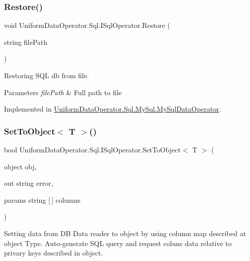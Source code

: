 \subsubsection{\texorpdfstring{Restore()}{Restore()}}
{\footnotesize\ttfamily void Uniform\+Data\+Operator.\+Sql.\+I\+Sql\+Operator.\+Restore (\begin{DoxyParamCaption}\item[{string}]{file\+Path }\end{DoxyParamCaption})}



Restoring S\+QL db from file. 


\begin{DoxyParams}{Parameters}
{\em file\+Path} & Full path to file\\
\hline
\end{DoxyParams}


Implemented in \mbox{\hyperlink{class_uniform_data_operator_1_1_sql_1_1_my_sql_1_1_my_sql_data_operator_a22a9e92989ebdb3a52b8ebe409c59831}{Uniform\+Data\+Operator.\+Sql.\+My\+Sql.\+My\+Sql\+Data\+Operator}}.

\mbox{\label{interface_uniform_data_operator_1_1_sql_1_1_i_sql_operator_af96d3f0bd2b58dfad705d2bfc3eba8fc}} 
\subsubsection{\texorpdfstring{Set\+To\+Object$<$ T $>$()}{SetToObject< T >()}}
{\footnotesize\ttfamily bool Uniform\+Data\+Operator.\+Sql.\+I\+Sql\+Operator.\+Set\+To\+Object$<$ T $>$ (\begin{DoxyParamCaption}\item[{object}]{obj,  }\item[{out string}]{error,  }\item[{params string \mbox{[}$\,$\mbox{]}}]{columns }\end{DoxyParamCaption})}



Setting data from DB Data reader to object by using column map described at object Type. Auto-\/generate S\+QL query and request coluns data relative to privary keys described in object. 


